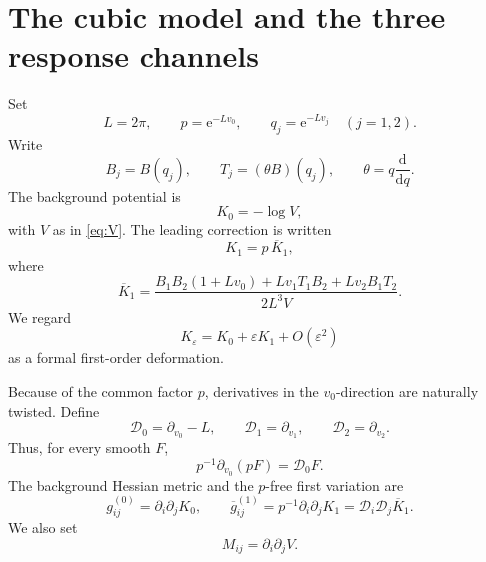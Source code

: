 \documentclass[11pt]{article}
\theoremstyle{definition}
\theoremstyle{remark}
\newcommand{\dd}{\mathrm{d}}
\newcommand{\e}{\mathrm{e}}
\newcommand{\bK}{\overline{K}}
\newcommand{\bg}{\overline{g}}
\begin{document}
\section{The cubic model and the three response channels}\label{sec:model}

Set
\begin{equation}\label{eq:Lpq}
 L=2\pi,
 \qquad
 p=\e^{-Lv_0},
 \qquad
 q_j=\e^{-Lv_j}\quad (j=1,2).
\end{equation}
Write
\[
 B_j=B(q_j),
 \qquad
 T_j=(\theta B)(q_j),
 \qquad
 \theta=q\frac{\dd}{\dd q}.
\]
The background potential is
\begin{equation}\label{eq:K0}
 K_0=-\log V,
\end{equation}
with \(V\) as in \eqref{eq:V}. The leading correction is written
\begin{equation}\label{eq:K1}
 K_1=p\,\bK_1,
\end{equation}
where
\begin{equation}\label{eq:K1bar}
 \bK_1
 =\frac{
 B_1B_2(1+Lv_0)
 +Lv_1T_1B_2
 +Lv_2B_1T_2
 }{2L^3V}.
\end{equation}
We regard
\begin{equation}\label{eq:Keps}
 K_\varepsilon=K_0+\varepsilon K_1+O(\varepsilon^2)
\end{equation}
as a formal first-order deformation.

Because of the common factor \(p\), derivatives in the \(v_0\)-direction are naturally twisted. Define
\begin{equation}\label{eq:twistedD}
 \mathscr D_0=\partial_{v_0}-L,
 \qquad
 \mathscr D_1=\partial_{v_1},
 \qquad
 \mathscr D_2=\partial_{v_2}.
\end{equation}
Thus, for every smooth \(F\),
\[
 p^{-1}\partial_{v_0}(pF)=\mathscr D_0F.
\]
The background Hessian metric and the \(p\)-free first variation are
\begin{equation}\label{eq:gdefs}
 g^{(0)}_{ij}=\partial_i\partial_jK_0,
 \qquad
 \bg^{(1)}_{ij}=p^{-1}\partial_i\partial_jK_1
 =\mathscr D_i\mathscr D_j\bK_1.
\end{equation}
We also set
\begin{equation}\label{eq:Mdef}
 M_{ij}=\partial_i\partial_jV.
\end{equation}
\end{document}
